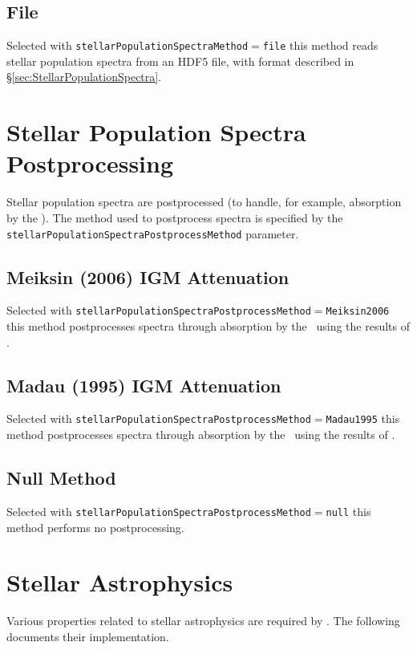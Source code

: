 \subsection{File}

Selected with {\tt stellarPopulationSpectraMethod}$=${\tt file} this method reads stellar population spectra from an HDF5 file, with format described in \S\ref{sec:StellarPopulationSpectra}.

\section{Stellar Population Spectra Postprocessing}

Stellar population spectra are postprocessed (to handle, for example, absorption by the \IGM). The method used to postprocess spectra is specified by the {\tt stellarPopulationSpectraPostprocessMethod} parameter.

\subsection{Meiksin (2006) IGM Attenuation}

Selected with {\tt stellarPopulationSpectraPostprocessMethod}$=${\tt Meiksin2006} this method postprocesses spectra through absorption by the \IGM\ using the results of \cite{meiksin_colour_2006}.

\subsection{Madau (1995) IGM Attenuation}

Selected with {\tt stellarPopulationSpectraPostprocessMethod}$=${\tt Madau1995} this method postprocesses spectra through absorption by the \IGM\ using the results of \cite{madau_radiative_1995}.

\subsection{Null Method}

Selected with {\tt stellarPopulationSpectraPostprocessMethod}$=${\tt null} this method performs no postprocessing.

\section{Stellar Astrophysics}

Various properties related to stellar astrophysics are required by \glc. The following documents their implementation.

